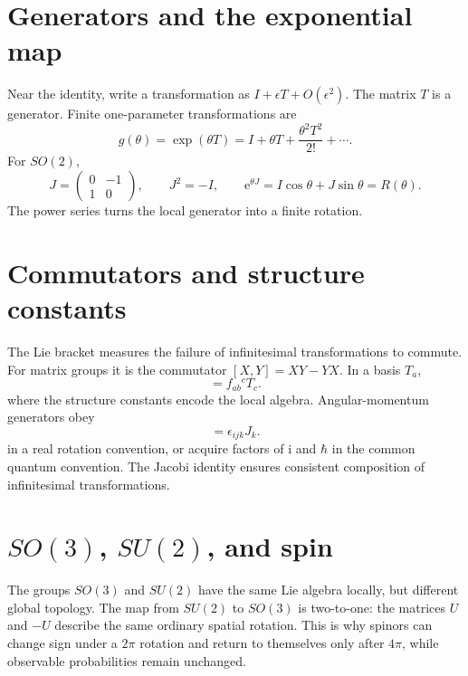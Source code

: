 \documentclass[11pt,oneside]{book}
\newcommand{\ii}{\mathrm{i}}
\newcommand{\ee}{\mathrm{e}}
\theoremstyle{reviewstyle}
\begin{document}
\section{Generators and the exponential map}
Near the identity, write a transformation as $I+\epsilon T+O(\epsilon^2)$. The matrix $T$ is a generator. Finite one-parameter transformations are
\begin{equation}g(\theta)=\exp(\theta T)=I+\theta T+\frac{\theta^2T^2}{2!}+\cdots.
\end{equation}
For $SO(2)$,
\begin{equation}
J=\begin{pmatrix}0&-1\\1&0\end{pmatrix},\qquad J^2=-I,
\qquad \ee^{\theta J}=I\cos\theta+J\sin\theta=R(\theta).
\end{equation}
The power series turns the local generator into a finite rotation.

\section{Commutators and structure constants}
The Lie bracket measures the failure of infinitesimal transformations to commute. For matrix groups it is the commutator $[X,Y]=XY-YX$. In a basis $T_a$,
\begin{equation}
[T_a,T_b]=f_{ab}{}^cT_c.
\end{equation}
where the structure constants encode the local algebra. Angular-momentum generators obey
\begin{equation}
[J_i,J_j]=\epsilon_{ijk}J_k.
\end{equation}
in a real rotation convention, or acquire factors of $\ii$ and $\hbar$ in the common quantum convention. The Jacobi identity ensures consistent composition of infinitesimal transformations.

\section{\texorpdfstring{$SO(3)$, $SU(2)$, and spin}{SO(3), SU(2), and spin}}
The groups $SO(3)$ and $SU(2)$ have the same Lie algebra locally, but different global topology. The map from $SU(2)$ to $SO(3)$ is two-to-one: the matrices $U$ and $-U$ describe the same ordinary spatial rotation. This is why spinors can change sign under a $2\pi$ rotation and return to themselves only after $4\pi$, while observable probabilities remain unchanged.
\end{document}
